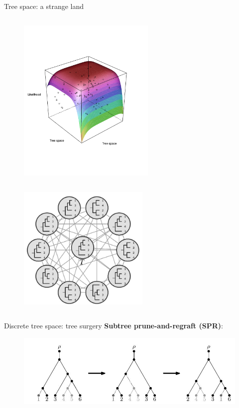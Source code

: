 \documentclass[newPxFont,numfooter,sectionpages]{beamer}
\begin{document}
\begin{frame}{Tree space: a strange land}
 \begin{column}{0.55\textwidth}
\begin{figure}
	\includegraphics[width=\textwidth,height=8cm]{figures/treespace_5taxa_likelihood.pdf}
\end{figure}
\end{column}
 \begin{column}{0.45\textwidth}
\begin{figure}
	\includegraphics[width=\textwidth,height=6cm]{figures/spr_graph.jpg}
\end{figure}
\end{column}
\end{frame}

\begin{frame}{Discrete tree space: tree surgery}
\textbf{Subtree prune-and-regraft (SPR)}:
\begin{center}
 \begin{figure}
	\includegraphics[scale=0.5]{figures/two_sprs.jpg}
\end{figure}
\end{center}
\end{frame}
\end{document}
